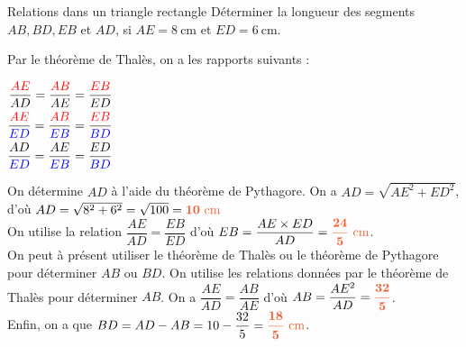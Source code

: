\documentclass{beamer}
\begin{document}
\begin{frame}{Relations dans un triangle rectangle}
 Déterminer la longueur des segments $AB, BD, EB$ et $AD$, si $AE = 8~\text{cm}$ et $ED = 6~\text{cm}$.

 \begin{center}
\end{center}
\end{frame}
\begin{frame}
	Par le théorème de Thalès, on a les rapports suivants :  
\medskip

$\begin{aligned}    
\dfrac{{\color{red} AE}}{{\color{black} AD}} = \dfrac{{\color{red} AB}}{{\color{black} AE}} = \dfrac{{\color{red} EB}}{{\color{black} ED}}\\
\dfrac{{\color{red} AE}}{{\color{blue} ED}} = \dfrac{{\color{red} AB}}{{\color{blue} EB}} = \dfrac{{\color{red} EB}}{{\color{blue} BD}}\\
\dfrac{{\color{black} AD}}{{\color{blue} ED}} = \dfrac{{\color{black} AE}}{{\color{blue} EB}} = \dfrac{{\color{black} ED}}{{\color{blue} BD}}
\end{aligned}$
\medskip

On détermine $AD$ à l'aide du théorème de Pythagore. On a $AD = \sqrt{AE^2 + ED^2}$, d'où $AD = \sqrt{8^2 + 6^2} = \sqrt{100} = {\color[HTML]{f15929}\boldsymbol{10~\text{cm}}}$
          \\ On utilise la relation $\dfrac{AE}{AD}=\dfrac{EB}{ED}$ d'où $EB=\dfrac{AE\times ED}{AD}={\color[HTML]{f15929}\boldsymbol{\dfrac{24}{5}~\text{cm}}}$.
          \\ On peut à présent utiliser le théorème de Thalès ou le théorème de Pythagore pour déterminer $AB$ ou $BD$. On utilise les relations données par le théorème de Thalès pour déterminer $AB$. 
          On a $\dfrac{AE}{AD}=\dfrac{AB}{AE}$ d'où $AB=\dfrac{AE^2}{AD}={\color[HTML]{f15929}\boldsymbol{\dfrac{32}{5}}}$.
          \\ Enfin, on a que $BD = AD-AB=10-\dfrac{32}{5}={\color[HTML]{f15929}\boldsymbol{\dfrac{18}{5}~\text{cm}}}$.
\end{frame}
\end{document}
